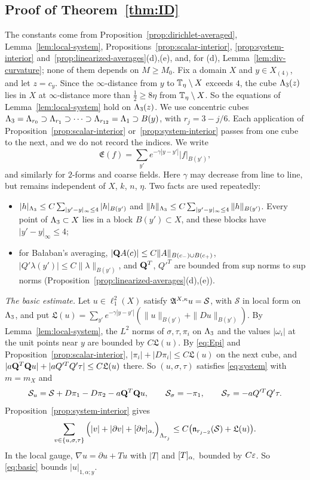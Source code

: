 \subsection{Proof of Theorem~\ref{thm:ID}}\label{ss:36.4}

The constants come from Proposition~\ref{prop:dirichlet-averaged}, Lemma~\ref{lem:local-system}, Propositions~\ref{prop:scalar-interior}, \ref{prop:system-interior} and~\ref{prop:linearized-averages}(d),(e), and, for (d), Lemma~\ref{lem:div-curvature}; none of them depends on $M\ge M_0$. Fix a domain $X$ and $y\in X_{(4)}$, and let $z=c_y$. Since the $\infty$-distance from $y$ to $\mathbb T_\eta\setminus X$ exceeds $4$, the cube $\Lambda_3(z)$ lies in $X$ at $\infty$-distance more than $\frac12\ge8\eta$ from $\mathbb T_\eta\setminus X$. So the equations of Lemma~\ref{lem:local-system} hold on $\Lambda_3(z)$. We use concentric cubes $\Lambda_3=\Lambda_{r_0}\supset\Lambda_{r_1}\supset\dots\supset\Lambda_{r_{12}}=\Lambda_1\supset B(y)$, with $r_j=3-j/6$. Each application of Proposition~\ref{prop:scalar-interior} or~\ref{prop:system-interior} passes from one cube to the next, and we do not record the indices. We write
\[
\mathfrak E(f)=\sum_{y'}e^{-\gamma|y-y'|}|f|_{B(y')},
\]
and similarly for $2$-forms and coarse fields. Here $\gamma$ may decrease from line to line, but remains independent of $X$, $k$, $n$, $\eta$. Two facts are used repeatedly:
\begin{itemize}
\item $|h|_{\Lambda_3}\le C\sum_{|y'-y|_\infty\le4}|h|_{B(y')}$ and $\|h\|_{\Lambda_3}\le C\sum_{|y'-y|_\infty\le4}\|h\|_{B(y')}$. Every point of $\Lambda_3\subset X$ lies in a block $B(y')\subset X$, and these blocks have $|y'-y|_\infty\le4$;
\item for Ba\l aban's averaging, $|\mathbf Q A(c)|\le C\|A\|_{B(c_-)\cup B(c_+)}$, $|Q'\lambda(y')|\le C\|\lambda\|_{B(y')}$, and $\mathbf Q^T$, $Q'^T$ are bounded from sup norms to sup norms (Proposition~\ref{prop:linearized-averages}(d),(e)).
\end{itemize}

\emph{The basic estimate.} Let $u\in\ell^2_1(X)$ satisfy $\mathfrak A^{X,\kappa}u=\mathcal S$, with $\mathcal S$ in local form on $\Lambda_3$, and put $\mathfrak L(u)=\sum_{y'}e^{-\gamma|y-y'|}(\|u\|_{B(y')}+\|Du\|_{B(y')})$. By Lemma~\ref{lem:local-system}, the $L^2$ norms of $\sigma,\tau,\pi_i$ on $\Lambda_3$ and the values $|\omega_i|$ at the unit points near $y$ are bounded by $C\mathfrak L(u)$. By \eqref{eq:Epi} and Proposition~\ref{prop:scalar-interior}, $|\pi_i|+|D\pi_i|\le C\mathfrak L(u)$ on the next cube, and $|a\mathbf Q^T\mathbf Q u|+|aQ'^TQ'\tau|\le C\mathfrak L(u)$ there. So $(u,\sigma,\tau)$ satisfies \eqref{eq:system} with $m=m_X$ and
\[
\mathcal S_u=\mathcal S+D\pi_1-D\pi_2-a\mathbf Q^T\mathbf Q u,\qquad\mathcal S_\sigma=-\pi_1,\qquad\mathcal S_\tau=-aQ'^TQ'\tau .
\]
Proposition~\ref{prop:system-interior} gives
\begin{equation}\label{eq:basic}
\sum_{v\in\{u,\sigma,\tau\}}\Big(|v|+|\partial v|+[\partial v]_{\alpha,}\Big)_{\Lambda_{r_j}}\le C\big(\mathfrak n_{r_{j-2}}(\mathcal S)+\mathfrak L(u)\big).
\end{equation}
In the local gauge, $\nabla u=\partial u+Tu$ with $|T|$ and $[T]_{\alpha,}$ bounded by $C\varepsilon$. So \eqref{eq:basic} bounds $|u|_{1,\alpha;y}$.

